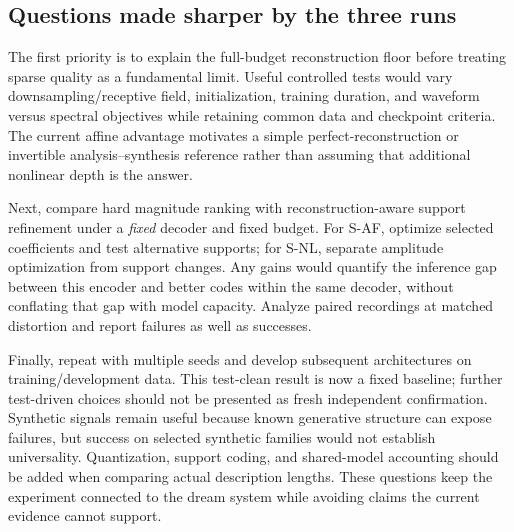 \documentclass[11pt,a4paper]{article}
\begin{document}
\subsection{Questions made sharper by the three runs}
The first priority is to explain the full-budget reconstruction floor before treating sparse quality as a fundamental limit. Useful controlled tests would vary downsampling/receptive field, initialization, training duration, and waveform versus spectral objectives while retaining common data and checkpoint criteria. The current affine advantage motivates a simple perfect-reconstruction or invertible analysis--synthesis reference rather than assuming that additional nonlinear depth is the answer.

Next, compare hard magnitude ranking with reconstruction-aware support refinement under a \emph{fixed} decoder and fixed budget. For S-AF, optimize selected coefficients and test alternative supports; for S-NL, separate amplitude optimization from support changes. Any gains would quantify the inference gap between this encoder and better codes within the same decoder, without conflating that gap with model capacity. Analyze paired recordings at matched distortion and report failures as well as successes.

Finally, repeat with multiple seeds and develop subsequent architectures on training/development data. This test-clean result is now a fixed baseline; further test-driven choices should not be presented as fresh independent confirmation. Synthetic signals remain useful because known generative structure can expose failures, but success on selected synthetic families would not establish universality. Quantization, support coding, and shared-model accounting should be added when comparing actual description lengths. These questions keep the experiment connected to the dream system while avoiding claims the current evidence cannot support.



\end{document}
